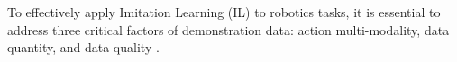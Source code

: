 

To effectively apply Imitation Learning (IL) to robotics tasks, it is essential to address three critical factors of demonstration data: action multi-modality, data quantity, and data quality \cite{mandlekar2022matters}.

